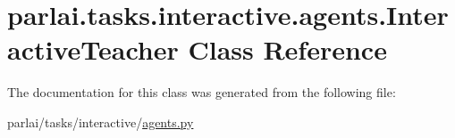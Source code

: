 \hypertarget{classparlai_1_1tasks_1_1interactive_1_1agents_1_1InteractiveTeacher}{}\section{parlai.\+tasks.\+interactive.\+agents.\+Interactive\+Teacher Class Reference}
\label{classparlai_1_1tasks_1_1interactive_1_1agents_1_1InteractiveTeacher}


The documentation for this class was generated from the following file\+:\begin{DoxyCompactItemize}
\item 
parlai/tasks/interactive/\hyperlink{parlai_2tasks_2interactive_2agents_8py}{agents.\+py}\end{DoxyCompactItemize}
